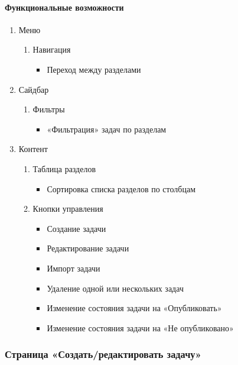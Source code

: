 \paragraph{Функциональные возможности}
\begin{enumerate}
  \item Меню
  \begin{enumerate}
    \item Навигация
    \begin{itemize}
      \item Переход между разделами
    \end{itemize}
  \end{enumerate}

  \item Сайдбар
  \begin{enumerate}
    \item Фильтры
    \begin{itemize}
      \item «Фильтрация» задач по разделам
    \end{itemize}
  \end{enumerate}

  \item Контент
    \begin{enumerate}
      \item Таблица разделов
      \begin{itemize}
        \item Сортировка списка разделов по столбцам
      \end{itemize}

      \item Кнопки управления
        \begin{itemize}
          \item Создание задачи
          \item Редактирование задачи
          \item Импорт задачи
          \item Удаление одной или нескольких задач
          \item Изменение состояния задачи на «Опубликовать»
          \item Изменение состояния задачи на «Не опубликовано»
        \end{itemize}
    \end{enumerate}
\end{enumerate}

\subsubsection{Страница «Создать/редактировать задачу»}
